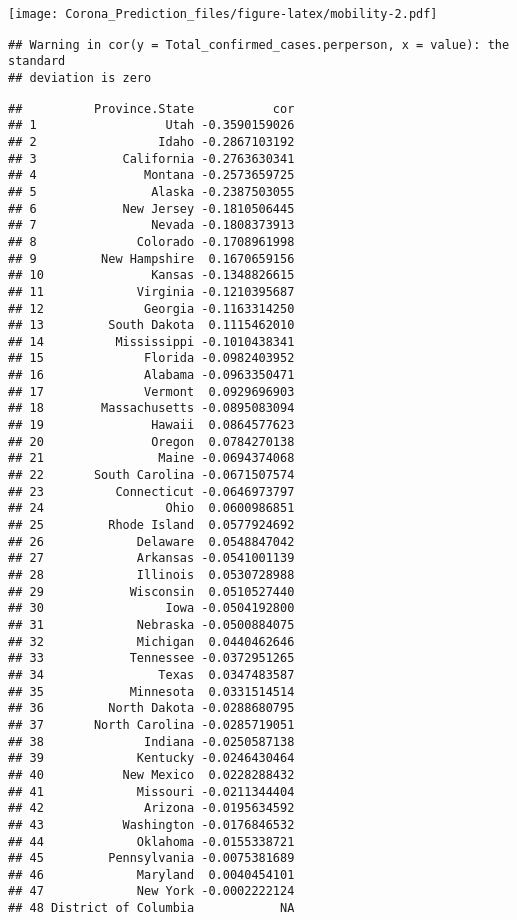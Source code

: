\documentclass[]{article}
\newenvironment{Shaded}{\begin{snugshade}}{\end{snugshade}}
\newcommand{\KeywordTok}[1]{\textcolor[rgb]{0.13,0.29,0.53}{\textbf{{#1}}}}
\newcommand{\DataTypeTok}[1]{\textcolor[rgb]{0.13,0.29,0.53}{{#1}}}
\newcommand{\StringTok}[1]{\textcolor[rgb]{0.31,0.60,0.02}{{#1}}}
\newcommand{\NormalTok}[1]{{#1}}
\begin{document}
\texttt{[image: Corona\_Prediction\_files/figure-latex/mobility-2.pdf]}

\begin{Shaded}
\end{Shaded}

\begin{verbatim}
## Warning in cor(y = Total_confirmed_cases.perperson, x = value): the standard
## deviation is zero
\end{verbatim}

\begin{verbatim}
##          Province.State           cor
## 1                  Utah -0.3590159026
## 2                 Idaho -0.2867103192
## 3            California -0.2763630341
## 4               Montana -0.2573659725
## 5                Alaska -0.2387503055
## 6            New Jersey -0.1810506445
## 7                Nevada -0.1808373913
## 8              Colorado -0.1708961998
## 9         New Hampshire  0.1670659156
## 10               Kansas -0.1348826615
## 11             Virginia -0.1210395687
## 12              Georgia -0.1163314250
## 13         South Dakota  0.1115462010
## 14          Mississippi -0.1010438341
## 15              Florida -0.0982403952
## 16              Alabama -0.0963350471
## 17              Vermont  0.0929696903
## 18        Massachusetts -0.0895083094
## 19               Hawaii  0.0864577623
## 20               Oregon  0.0784270138
## 21                Maine -0.0694374068
## 22       South Carolina -0.0671507574
## 23          Connecticut -0.0646973797
## 24                 Ohio  0.0600986851
## 25         Rhode Island  0.0577924692
## 26             Delaware  0.0548847042
## 27             Arkansas -0.0541001139
## 28             Illinois  0.0530728988
## 29            Wisconsin  0.0510527440
## 30                 Iowa -0.0504192800
## 31             Nebraska -0.0500884075
## 32             Michigan  0.0440462646
## 33            Tennessee -0.0372951265
## 34                Texas  0.0347483587
## 35            Minnesota  0.0331514514
## 36         North Dakota -0.0288680795
## 37       North Carolina -0.0285719051
## 38              Indiana -0.0250587138
## 39             Kentucky -0.0246430464
## 40           New Mexico  0.0228288432
## 41             Missouri -0.0211344404
## 42              Arizona -0.0195634592
## 43           Washington -0.0176846532
## 44             Oklahoma -0.0155338721
## 45         Pennsylvania -0.0075381689
## 46             Maryland  0.0040454101
## 47             New York -0.0002222124
## 48 District of Columbia            NA
\end{verbatim}
\end{document}
